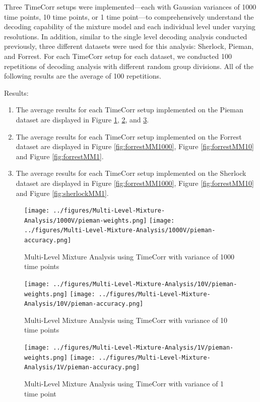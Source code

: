 \documentclass[11pt]{article}
\begin{document}
Three TimeCorr setups were implemented---each with Gaussian variances of 1000 time points, 10 time points, or 1 time point---to comprehensively understand the decoding capability of the mixture model and each individual level under varying resolutions. In addition, similar to the single level decoding analysis conducted previously, three different datasets were used for this analysis: Sherlock, Pieman, and Forrest. For each TimeCorr setup for each dataset, we conducted 100 repetitions of decoding analysis with different random group divisions. All of the following results are the average of 100 repetitions.

Results:
\begin{enumerate}
\item The average results for each TimeCorr setup implemented on the Pieman dataset are displayed in Figure \ref{fig:piemanMM1000}, \ref{fig:piemanMM10}, and \ref{fig:piemanMM1}.
\item The average results for each TimeCorr setup implemented on the Forrest dataset are displayed in Figure \ref{fig:forrestMM1000}, Figure \ref{fig:forrestMM10} and Figure \ref{fig:forrestMM1}.
\item The average results for each TimeCorr setup implemented on the Sherlock dataset are displayed in Figure \ref{fig:forrestMM1000}, Figure \ref{fig:forrestMM10} and Figure \ref{fig:sherlockMM1}.
\end{enumerate}

\begin{figure}[!htb]
\caption{Multi-Level Mixture Analysis using TimeCorr with variance of 1000 time points}
\centering
\texttt{[image: ../figures/Multi-Level-Mixture-Analysis/1000V/pieman-weights.png]}
\texttt{[image: ../figures/Multi-Level-Mixture-Analysis/1000V/pieman-accuracy.png]}
\label{fig:piemanMM1000}
\end{figure}

\begin{figure}[!htb]
\caption{Multi-Level Mixture Analysis using TimeCorr with variance of 10 time points}
\centering
\texttt{[image: ../figures/Multi-Level-Mixture-Analysis/10V/pieman-weights.png]}
\texttt{[image: ../figures/Multi-Level-Mixture-Analysis/10V/pieman-accuracy.png]}
\label{fig:piemanMM10}
\end{figure}

\begin{figure}[!htb]
\caption{Multi-Level Mixture Analysis using TimeCorr with variance of 1 time point}
\centering
\texttt{[image: ../figures/Multi-Level-Mixture-Analysis/1V/pieman-weights.png]}
\texttt{[image: ../figures/Multi-Level-Mixture-Analysis/1V/pieman-accuracy.png]}
\label{fig:piemanMM1}
\end{figure}
\end{document}
